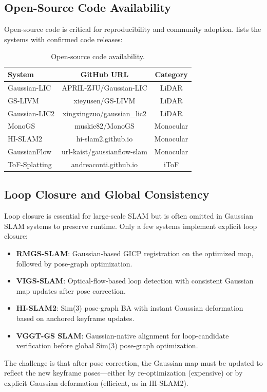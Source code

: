 \subsection{Open-Source Code Availability}

Open-source code is critical for reproducibility and community adoption.
 lists the systems with confirmed code releases:

\begin{table}[t]
\centering
\caption{Open-source code availability.}
\label{tab:code}
\scriptsize
\begin{tabular}{lcc}
\toprule
\textbf{System} & \textbf{GitHub URL} & \textbf{Category} \\
\midrule
Gaussian-LIC & APRIL-ZJU/Gaussian-LIC & LiDAR \\
GS-LIVM & xieyusen/GS-LIVM & LiDAR \\
Gaussian-LIC2 & xingxingzuo/gaussian\_lic2 & LiDAR \\
MonoGS & muskie82/MonoGS & Monocular \\
HI-SLAM2 & hi-slam2.github.io & Monocular \\
GaussianFlow & url-kaist/gaussianflow-slam & Monocular \\
ToF-Splatting & andreaconti.github.io & iToF \\
\bottomrule
\end{tabular}
\end{table}

\subsection{Loop Closure and Global Consistency}

Loop closure is essential for large-scale SLAM but is often omitted in
Gaussian SLAM systems to preserve runtime.  Only a few systems implement
explicit loop closure:

\begin{itemize}
    \item \textbf{RMGS-SLAM}: Gaussian-based GICP registration on the
    optimized map, followed by pose-graph optimization.
    \item \textbf{VIGS-SLAM}: Optical-flow-based loop detection with
    consistent Gaussian map updates after pose correction.
    \item \textbf{HI-SLAM2}: Sim(3) pose-graph BA with instant Gaussian
    deformation based on anchored keyframe updates.
    \item \textbf{VGGT-GS SLAM}: Gaussian-native alignment for
    loop-candidate verification before global Sim(3) pose-graph
    optimization.
\end{itemize}

The challenge is that after pose correction, the Gaussian map must be
updated to reflect the new keyframe poses---either by re-optimization
(expensive) or by explicit Gaussian deformation (efficient, as in HI-SLAM2).
